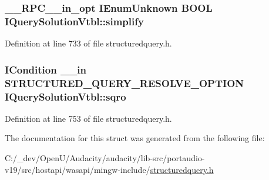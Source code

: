 \subsubsection[{\texorpdfstring{simplify}{simplify}}]{ {\bf \+\_\+\+\_\+\+R\+P\+C\+\_\+\+\_\+in\+\_\+opt} I\+Enum\+Unknown {\bf B\+O\+OL} I\+Query\+Solution\+Vtbl\+::simplify}\hypertarget{struct_i_query_solution_vtbl_a285c085be222ccf98b15b5a556896dc8}{}\label{struct_i_query_solution_vtbl_a285c085be222ccf98b15b5a556896dc8}


Definition at line 733 of file structuredquery.\+h.

\subsubsection[{\texorpdfstring{sqro}{sqro}}]{ {\bf I\+Condition} {\bf \+\_\+\+\_\+in} {\bf S\+T\+R\+U\+C\+T\+U\+R\+E\+D\+\_\+\+Q\+U\+E\+R\+Y\+\_\+\+R\+E\+S\+O\+L\+V\+E\+\_\+\+O\+P\+T\+I\+ON} I\+Query\+Solution\+Vtbl\+::sqro}\hypertarget{struct_i_query_solution_vtbl_a0f3a947c57c0f5cf8e5321780be78451}{}\label{struct_i_query_solution_vtbl_a0f3a947c57c0f5cf8e5321780be78451}


Definition at line 753 of file structuredquery.\+h.



The documentation for this struct was generated from the following file\+:\begin{DoxyCompactItemize}
\item 
C\+:/\+\_\+dev/\+Open\+U/\+Audacity/audacity/lib-\/src/portaudio-\/v19/src/hostapi/wasapi/mingw-\/include/\hyperlink{structuredquery_8h}{structuredquery.\+h}\end{DoxyCompactItemize}
